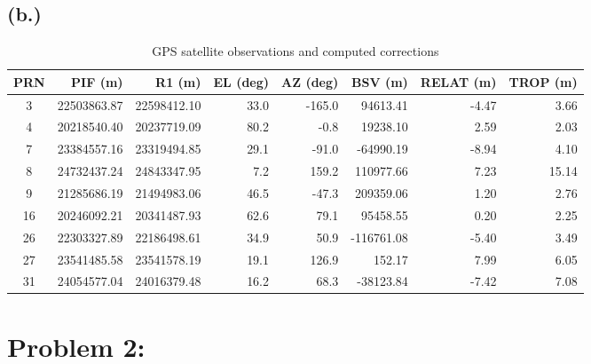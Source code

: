 \documentclass[11pt]{article}
\begin{document}
\subsection*{(b.)}
\begin{table}[h!]
    \centering
    \small
    \begin{tabular}{|c|r|r|r|r|r|r|r|}
        \hline
        \textbf{PRN} & \textbf{PIF (m)} & \textbf{R1 (m)} &
        \textbf{EL (deg)} & \textbf{AZ (deg)} &
        \textbf{BSV (m)} & \textbf{RELAT (m)} &
        \textbf{TROP (m)} \\
        \hline
        3  & 22503863.87 & 22598412.10 & 33.0 & -165.0 & 94613.41 & -4.47 & 3.66 \\ \hline
        4  & 20218540.40 & 20237719.09 & 80.2 & -0.8 & 19238.10 &  2.59 & 2.03 \\ \hline
        7  & 23384557.16 & 23319494.85 & 29.1 & -91.0 & -64990.19 & -8.94 & 4.10 \\ \hline
        8  & 24732437.24 & 24843347.95 &  7.2 & 159.2 & 110977.66 &  7.23 & 15.14 \\ \hline
        9  & 21285686.19 & 21494983.06 & 46.5 & -47.3 & 209359.06 &  1.20 & 2.76 \\ \hline
        16 & 20246092.21 & 20341487.93 & 62.6 &  79.1 & 95458.55 &  0.20 & 2.25 \\ \hline
        26 & 22303327.89 & 22186498.61 & 34.9 &  50.9 & -116761.08 & -5.40 & 3.49 \\ \hline
        27 & 23541485.58 & 23541578.19 & 19.1 & 126.9 & 152.17 &  7.99 & 6.05 \\ \hline
        31 & 24054577.04 & 24016379.48 & 16.2 &  68.3 & -38123.84 & -7.42 & 7.08 \\ \hline
    \end{tabular}
    \caption{GPS satellite observations and computed corrections}
    \label{tab:gps_observations}
\end{table}
\newpage
\section*{Problem 2:}
\end{document}
